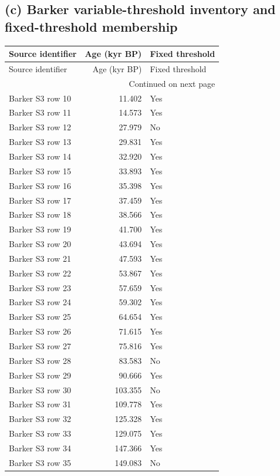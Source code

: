 \subsection*{(c) Barker variable-threshold inventory and fixed-threshold membership}
{\small
\begin{longtable}{lrl}
\toprule
Source identifier & Age (kyr BP) & Fixed threshold \\
\midrule
\endfirsthead
\toprule
Source identifier & Age (kyr BP) & Fixed threshold \\
\midrule
\endhead
\midrule
\multicolumn{3}{r}{Continued on next page} \\
\midrule
\endfoot
\bottomrule
\endlastfoot
Barker S3 row 10 & 11.402 & Yes \\
Barker S3 row 11 & 14.573 & Yes \\
Barker S3 row 12 & 27.979 & No \\
Barker S3 row 13 & 29.831 & Yes \\
Barker S3 row 14 & 32.920 & Yes \\
Barker S3 row 15 & 33.893 & Yes \\
Barker S3 row 16 & 35.398 & Yes \\
Barker S3 row 17 & 37.459 & Yes \\
Barker S3 row 18 & 38.566 & Yes \\
Barker S3 row 19 & 41.700 & Yes \\
Barker S3 row 20 & 43.694 & Yes \\
Barker S3 row 21 & 47.593 & Yes \\
Barker S3 row 22 & 53.867 & Yes \\
Barker S3 row 23 & 57.659 & Yes \\
Barker S3 row 24 & 59.302 & Yes \\
Barker S3 row 25 & 64.654 & Yes \\
Barker S3 row 26 & 71.615 & Yes \\
Barker S3 row 27 & 75.816 & Yes \\
Barker S3 row 28 & 83.583 & No \\
Barker S3 row 29 & 90.666 & Yes \\
Barker S3 row 30 & 103.355 & No \\
Barker S3 row 31 & 109.778 & Yes \\
Barker S3 row 32 & 125.328 & Yes \\
Barker S3 row 33 & 129.075 & Yes \\
Barker S3 row 34 & 147.366 & Yes \\
Barker S3 row 35 & 149.083 & No \\

\end{longtable}}

